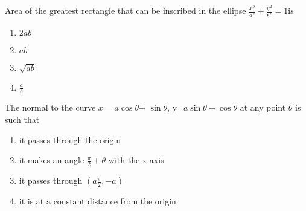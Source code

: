 \item Area of the greatest rectangle that can be inscribed in the ellipse $\frac{x^2}{a^2}+\frac{y^2}{b^2}=1$is
\begin{multicols}{2}
\begin{enumerate}
    \item $2ab$
    \item $ab$
    \item $\sqrt{ab}$
    \item $\frac{a}{b}$
\end{enumerate}
\end{multicols}
\item The normal to the curve $x=a \cos \theta$+ $\sin\theta$, y=$a\sin\theta - \cos \theta$ at any point $\theta$ is such that
\begin{multicols}{2}
\begin{enumerate}
    \item it passes through the origin
    \item it makes an angle $\frac{\pi}{2}+\theta$ with the x axis
    \item it passes through $(a\frac{\pi}{2},-a)$
    \item it is at a constant distance from the origin
\end{enumerate}
\end{multicols}


